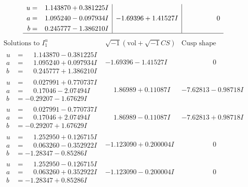 \documentclass[1p]{elsarticle_modified}
\theoremstyle{definition}
\newcommand{\I}{\sqrt{-1}}
\begin{document}
$$\begin{array}{c|c|c}
\begin{aligned}
u &= \phantom{-}1.143870 + 0.381225 I \\
a &= \phantom{-}1.095240 - 0.097934 I \\
b &= \phantom{-}0.245777 - 1.386210 I\end{aligned}
 & -1.69396 + 1.41527 I & \phantom{-0.000000 } 0\\
 \hline 
 \end{array}$$\newpage$$\begin{array}{c|c|c}  
\text{Solutions to }I^u_{1}& \I (\text{vol} + \sqrt{-1}CS) & \text{Cusp shape}\\
 \hline 
\begin{aligned}
u &= \phantom{-}1.143870 - 0.381225 I \\
a &= \phantom{-}1.095240 + 0.097934 I \\
b &= \phantom{-}0.245777 + 1.386210 I\end{aligned}
 & -1.69396 - 1.41527 I & \phantom{-0.000000 } 0 \\ \hline\begin{aligned}
u &= \phantom{-}0.027991 + 0.770737 I \\
a &= \phantom{-}0.17046 - 2.07494 I \\
b &= -0.29207 - 1.67629 I\end{aligned}
 & \phantom{-}1.86989 + 0.11087 I & -7.62813 - 0.98718 I \\ \hline\begin{aligned}
u &= \phantom{-}0.027991 - 0.770737 I \\
a &= \phantom{-}0.17046 + 2.07494 I \\
b &= -0.29207 + 1.67629 I\end{aligned}
 & \phantom{-}1.86989 - 0.11087 I & -7.62813 + 0.98718 I \\ \hline\begin{aligned}
u &= \phantom{-}1.252950 + 0.126715 I \\
a &= \phantom{-}0.063260 - 0.352922 I \\
b &= -1.28347 - 0.85286 I\end{aligned}
 & -1.123090 + 0.200004 I & \phantom{-0.000000 } 0 \\ \hline\begin{aligned}
u &= \phantom{-}1.252950 - 0.126715 I \\
a &= \phantom{-}0.063260 + 0.352922 I \\
b &= -1.28347 + 0.85286 I\end{aligned}
 & -1.123090 - 0.200004 I & \phantom{-0.000000 } 0 \\ \hline\begin{aligned}

\end{aligned}
\end{array}$$
\end{document}

